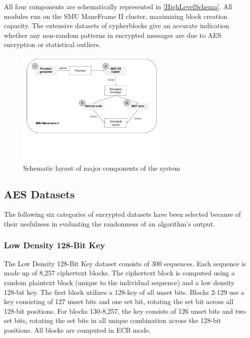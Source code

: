 \documentclass[conference]{IEEEtran}
\begin{document}
All four components are schematically represented in \autoref{HighLevelSchema}. All modules run on the SMU ManeFrame II cluster, maximizing block creation capacity. The extensive datasets of cypherblocks give an accurate indication whether any non-random patterns in encrypted messages are due to AES encryption or statistical outliers.

\begin{figure}[H]
\centering
\includegraphics[width=3in]{imgs/HighLevelSchema.png}
\caption{Schematic layout of major components of the system}
\label{HighLevelSchema}
\end{figure}


\subsection{AES Datasets}
The following six categories of encrypted datasets have been selected because of their usefulness in evaluating the randomness of an algorithm's output.
\subsubsection{Low Density 128-Bit Key} 
 
The Low Density 128-Bit Key dataset consists of 300 sequences. Each sequence is made up of 8,257 ciphertext blocks. The ciphertext block is computed using a random plaintext block (unique to the individual sequence) and a low density 128-bit key. The first block utilizes a 128-key of all unset bits. Blocks 2-129 use a key consisting of 127 unset bits and one set bit, rotating the set bit across all 128-bit positions. For blocks 130-8,257, the key consists of 126 unset bits and two set bits, rotating the set bits in all unique combination across the 128-bit positions. All blocks are computed in ECB mode.
\end{document}
